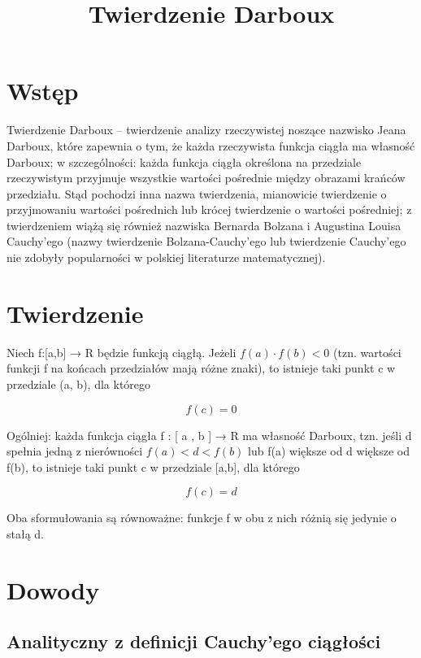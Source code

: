 \documentclass{article}
\begin{document}
\title{Twierdzenie Darboux}
\maketitle

\section*{Wstęp}
Twierdzenie Darboux – twierdzenie analizy rzeczywistej noszące nazwisko Jeana Darboux, które zapewnia o tym, że każda rzeczywista funkcja ciągła ma własność Darboux; w szczególności: każda funkcja ciągła określona na przedziale rzeczywistym przyjmuje wszystkie wartości pośrednie między obrazami krańców przedziału. Stąd pochodzi inna nazwa twierdzenia, mianowicie twierdzenie o przyjmowaniu wartości pośrednich lub krócej twierdzenie o wartości pośredniej; z twierdzeniem wiążą się również nazwiska Bernarda Bolzana i Augustina Louisa Cauchy’ego (nazwy twierdzenie Bolzana-Cauchy’ego lub twierdzenie Cauchy’ego nie zdobyły popularności w polskiej literaturze matematycznej).

\section*{Twierdzenie}

Niech f:[a,b] → R będzie funkcją ciągłą. Jeżeli \(f(a)\cdot f(b)<0\) (tzn. wartości funkcji f na końcach przedziałów mają różne znaki), to istnieje taki punkt c w przedziale (a, b), dla którego

\begin{equation}
	f(c)=0
\end{equation}

Ogólniej: każda funkcja ciągła f : [ a , b ] → R ma własność Darboux, tzn. jeśli d spełnia jedną z nierówności \(f(a)<d<f(b)\) lub f(a) większe od d większe od f(b), to istnieje taki punkt c w przedziale [a,b], dla którego

\begin{displaymath}
	f(c)=d
\end{displaymath}

Oba sformułowania są równoważne: funkcje f w obu z nich różnią się jedynie o stałą d.


\section*{Dowody}

\subsection*{Analityczny z definicji Cauchy'ego ciągłości}
\end{document}
